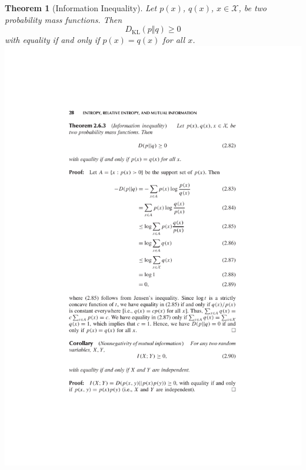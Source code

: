 \documentclass[12pt, a4paper]{article}
\newtheorem{theorem}{Theorem}
\newcommand{\dkl}[2]{D_{\mathrm{KL}}(#1 \Vert #2)}
\begin{document}
\begin{appendices}
\begin{theorem}[Information Inequality]
    Let $p(x)$, $q(x)$, $x\in\mathcal{X}$, be two probability mass functions. Then
    \[
        \dkl{p}{q} \geq 0  
    \]
    with equality if and only if $p(x)=q(x)$ for all $x$.
    \newline\newline
    \includegraphics[width=\textwidth]{../imgs/non-negative_DKL.pdf}

\end{theorem}


\end{appendices}
\end{document}
